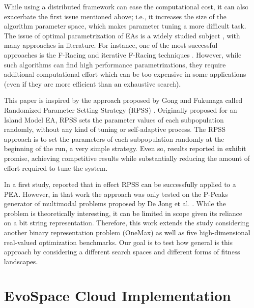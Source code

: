 \documentclass{llncs}
\begin{document}
While using a distributed framework can ease the computational cost, it can also exacerbate the first issue mentioned above;
i.e., it increases the size of the algorithm parameter space, which makes parameter tuning a more difficult task.
The issue of optimal parametrization of EAs is a widely studied subject \cite{de2007parameter}, 
with many approaches in literature. For instance, one of the most successful approaches 
is the F-Racing and iterative F-Racing techniques \cite{lopez2011irace}. 
However, while such algorithms can find high performance parametrizations, 
they require additional computational effort which can be too expensive in some applications
(even if they are more efficient than an exhaustive search).

This paper is inspired by the approach proposed by Gong and Fukunaga
called Randomized Parameter Setting Strategy (RPSS)
\cite{fuku1,fuku2}. 
Originally proposed for an Island Model EA, RPSS sets the parameter values of each subpopulation randomly, 
without any kind of tuning or self-adaptive process. The RPSS approach is to set the parameters 
of each subpopulation randomly at the beginning of the run, a very simple strategy.
Even so, results reported in \cite{fuku1,fuku2} exhibit promise, achieving competitive results 
while substantially reducing the amount of effort required to tune the system.

In a first study, \cite{garcia2014randomized} reported that in effect RPSS 
can be successfully applied to a PEA. However, in that work the
approach was only tested on the P-Peaks generator of multimodal problems proposed by De Jong et al. \cite{Jong:PS97}.
While the problem is theoretically interesting, it can be limited in scope given its reliance on a bit string representation.
Therefore, this work extends the study considering another binary representation problem (OneMax) as well as 
five high-dimensional real-valued optimization benchmarks. Our goal is
to test how general is this approach by considering a different search
spaces and different forms of fitness landscapes. 





\section{EvoSpace Cloud Implementation}
\label{sec:evo}
\end{document}
